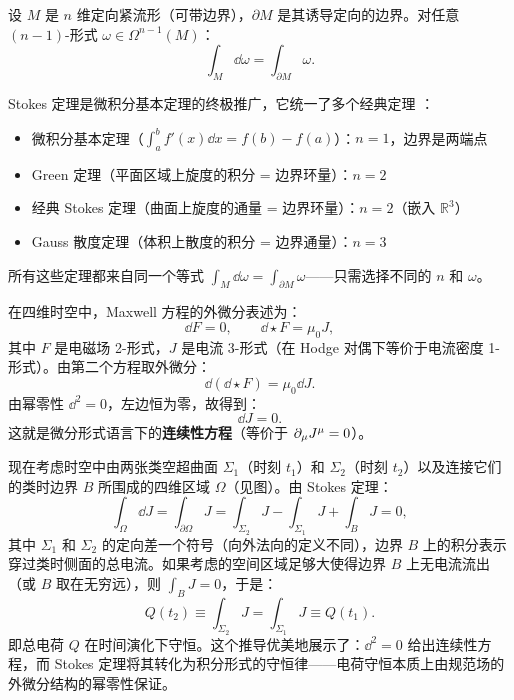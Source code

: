 \begin{theorem}[Stokes 定理]
设 $M$ 是 $n$ 维定向紧流形（可带边界），$\partial M$ 是其诱导定向的边界。对任意 $(n-1)$-形式 $\omega \in \Omega^{n-1}(M)$：
\begin{equation}
    \boxed{\int_M \dd\omega = \int_{\partial M} \omega}.
\end{equation}
\end{theorem}

\begin{remark}[统一性]
Stokes 定理是微积分基本定理的终极推广，它统一了多个经典定理 \cite{StokesTheorem2011}：
\begin{itemize}
    \item 微积分基本定理（$\int_a^b f'(x) \dd x = f(b) - f(a)$）：$n=1$，边界是两端点
    \item Green 定理（平面区域上旋度的积分 = 边界环量）：$n=2$
    \item 经典 Stokes 定理（曲面上旋度的通量 = 边界环量）：$n=2$（嵌入 $\mathbb{R}^3$）
    \item Gauss 散度定理（体积上散度的积分 = 边界通量）：$n=3$
\end{itemize}
所有这些定理都来自同一个等式 $\int_M \dd\omega = \int_{\partial M} \omega$——只需选择不同的 $n$ 和 $\omega$。
\end{remark}

\begin{example}
在四维时空中，Maxwell 方程的外微分表述为：
\begin{equation}
    \dd F = 0, \qquad \dd \star F = \mu_0 J,
\end{equation}
其中 $F$ 是电磁场 2-形式，$J$ 是电流 3-形式（在 Hodge 对偶下等价于电流密度 1-形式）。由第二个方程取外微分：
\begin{equation}
    \dd(\dd \star F) = \mu_0 \dd J.
\end{equation}
由幂零性 $\dd^2 = 0$，左边恒为零，故得到：
\begin{equation}
    \dd J = 0.
\end{equation}
这就是微分形式语言下的\textbf{连续性方程}（等价于 $\partial_\mu J^\mu = 0$）。

现在考虑时空中由两张类空超曲面 $\Sigma_1$（时刻 $t_1$）和 $\Sigma_2$（时刻 $t_2$）以及连接它们的类时边界 $B$ 所围成的四维区域 $\Omega$（见图）。由 Stokes 定理：
\begin{equation}
    \int_\Omega \dd J = \int_{\partial\Omega} J = \int_{\Sigma_2} J - \int_{\Sigma_1} J + \int_B J = 0,
\end{equation}
其中 $\Sigma_1$ 和 $\Sigma_2$ 的定向差一个符号（向外法向的定义不同），边界 $B$ 上的积分表示穿过类时侧面的总电流。如果考虑的空间区域足够大使得边界 $B$ 上无电流流出（或 $B$ 取在无穷远），则 $\int_B J = 0$，于是：
\begin{equation}
    Q(t_2) \equiv \int_{\Sigma_2} J = \int_{\Sigma_1} J \equiv Q(t_1).
\end{equation}
即总电荷 $Q$ 在时间演化下守恒。这个推导优美地展示了：$\dd^2 = 0$ 给出连续性方程，而 Stokes 定理将其转化为积分形式的守恒律——电荷守恒本质上由规范场的外微分结构的幂零性保证。
\end{example}

